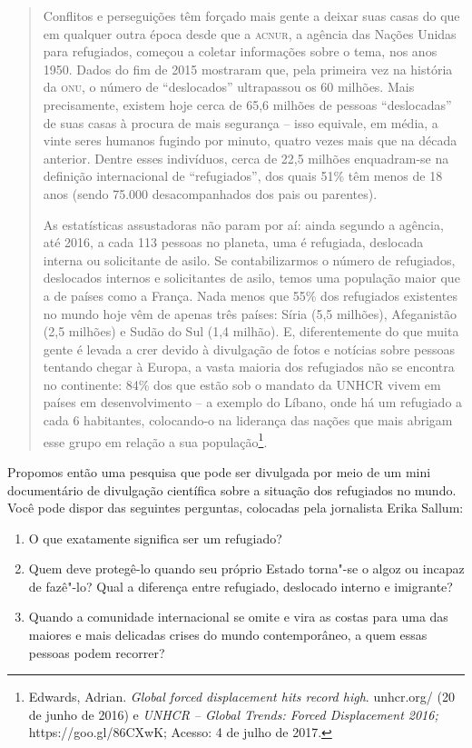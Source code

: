 \documentclass[12pt]{extarticle}
\begin{document}
\begin{quote}
Conflitos e perseguições têm forçado mais gente a deixar suas casas do
que em qualquer outra época desde que a \textsc{acnur}, a agência das Nações
Unidas para refugiados, começou a coletar informações sobre o tema, nos
anos 1950. Dados do fim de 2015 mostraram que, pela primeira vez na
história da \textsc{onu}, o número de ``deslocados'' ultrapassou os 60 milhões.
Mais precisamente, existem hoje cerca de 65,6 milhões de pessoas
``deslocadas'' de suas casas à procura de mais segurança -- isso
equivale, em média, a vinte seres humanos fugindo por minuto, quatro vezes
mais que na década anterior. Dentre esses indivíduos, cerca de 22,5 
milhões enquadram-se na definição internacional de ``refugiados'', dos
quais 51\% têm menos de 18 anos (sendo 75.000 desacompanhados dos pais
ou parentes).

As estatísticas assustadoras não param por aí: ainda segundo a agência,
até 2016, a cada 113 pessoas no planeta, uma é refugiada, deslocada
interna ou solicitante de asilo. Se contabilizarmos o número de
refugiados, deslocados internos e solicitantes de asilo, temos uma
população maior que a de países como a França. Nada menos que 55\% dos
refugiados existentes no mundo hoje vêm de apenas três países: Síria (5,5 milhões),
Afeganistão (2,5 milhões) e Sudão do Sul (1,4 milhão). E, diferentemente do que muita gente é levada a
crer devido à divulgação de fotos e notícias sobre pessoas tentando
chegar à Europa, a vasta maioria dos refugiados não se encontra no
continente: 84\% dos que estão sob o mandato da {UNHCR} vivem em países em
desenvolvimento -- a exemplo do Líbano, onde há um refugiado a cada 6
habitantes, colocando-o na liderança das nações que mais abrigam esse
grupo em relação a sua população\footnote{Edwards, Adrian. \emph{Global forced
  displacement hits record high}.
  {unhcr.org/} (20 de
  junho de 2016) e \emph{{UNHCR} -- Global Trends: Forced Displacement 2016;}
  https://goo.gl/86CXwK; Acesso: 4 
  de julho de 2017.}. 
\end{quote}

Propomos então uma pesquisa que pode ser divulgada por meio de
um mini documentário de divulgação científica sobre a situação dos refugiados 
no mundo. Você pode dispor das seguintes perguntas, colocadas pela 
jornalista Erika Sallum:

\begin{enumerate}
\item O que exatamente significa ser um refugiado? 
\item Quem deve protegê-lo quando seu próprio Estado torna"-se o algoz 
ou incapaz de fazê"-lo? Qual a
diferença entre refugiado, deslocado interno e imigrante? 
\item Quando a comunidade internacional se omite e vira as
costas para uma das maiores e mais delicadas crises do mundo contemporâneo, a
quem essas pessoas podem recorrer?
\end{enumerate}
\end{document}
